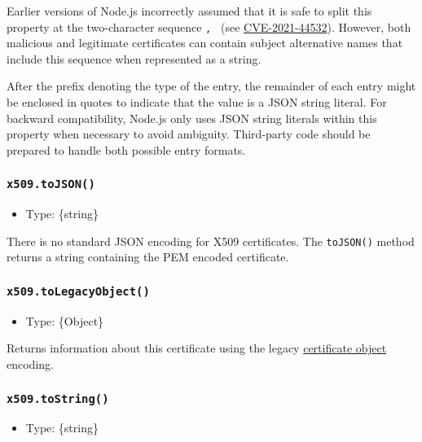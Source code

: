 Earlier versions of Node.js incorrectly assumed that it is safe to split
this property at the two-character sequence
\texttt{\textquotesingle{},\ \textquotesingle{}} (see
\href{https://cve.mitre.org/cgi-bin/cvename.cgi?name=CVE-2021-44532}{CVE-2021-44532}).
However, both malicious and legitimate certificates can contain subject
alternative names that include this sequence when represented as a
string.

After the prefix denoting the type of the entry, the remainder of each
entry might be enclosed in quotes to indicate that the value is a JSON
string literal. For backward compatibility, Node.js only uses JSON
string literals within this property when necessary to avoid ambiguity.
Third-party code should be prepared to handle both possible entry
formats.

\subsubsection{\texorpdfstring{\texttt{x509.toJSON()}}{x509.toJSON()}}\label{x509.tojson}

\begin{itemize}
\tightlist
\item
  Type: \{string\}
\end{itemize}

There is no standard JSON encoding for X509 certificates. The
\texttt{toJSON()} method returns a string containing the PEM encoded
certificate.

\subsubsection{\texorpdfstring{\texttt{x509.toLegacyObject()}}{x509.toLegacyObject()}}\label{x509.tolegacyobject}

\begin{itemize}
\tightlist
\item
  Type: \{Object\}
\end{itemize}

Returns information about this certificate using the legacy
\href{tls.md\#certificate-object}{certificate object} encoding.

\subsubsection{\texorpdfstring{\texttt{x509.toString()}}{x509.toString()}}\label{x509.tostring}

\begin{itemize}
\tightlist
\item
  Type: \{string\}
\end{itemize}

